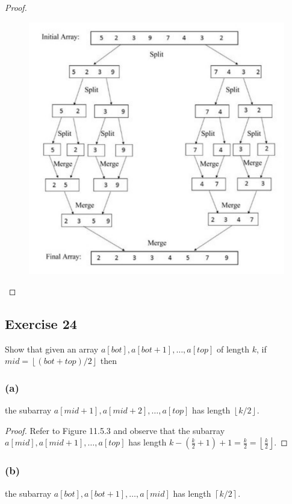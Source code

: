 \documentclass[14pt]{extarticle}
\newcommand{\floor}[1]{{\left\lfloor#1\right\rfloor}}
\newcommand{\ceil}[1]{{\left\lceil#1\right\rceil}}
\begin{document}
\begin{proof}
\begin{figure}[ht!]
\centering
\includegraphics[scale=0.4]{../images/11.5.23.png}
\end{figure}
\end{proof}

\subsection{Exercise 24}
Show that given an array \(a[bot], a[bot + 1], \ldots, a[top]\) of length \(k\), if \(mid = \floor{(bot + top)/2}\) then

\subsubsection{(a)}
the subarray \(a[mid + 1], a[mid + 2], \ldots, a[top]\) has length \(\floor{k/2}\).

\begin{proof}
Refer to Figure 11.5.3 and observe that the subarray \(a[mid], a[mid + 1], \ldots, a[top]\) has length \(k - (\frac{k}{2} + 
1) + 1 = \frac{k}{2} = \floor{\frac{k}{2}}\).
\end{proof}

\subsubsection{(b)}
the subarray \(a[bot], a[bot + 1], \ldots, a[mid]\) has length \(\ceil{k/2}\).
\end{document}
